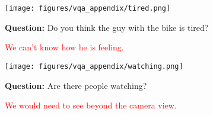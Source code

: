 \begin{figure}[h]
\begin{tcolorbox}[colback=gray!4, colframe=gray!50, arc=2mm, boxrule=0.5pt,left=9pt,right=9pt]
\begin{minipage}{0.48\textwidth}
\begin{tcolorbox}[colback=white, colframe=gray!50, arc=2mm, boxrule=0.5pt]
\begin{minipage}{0.46\textwidth}
\texttt{[image: figures/vqa\_appendix/tired.png]}
\end{minipage}
\hfill
\begin{minipage}{0.5\textwidth}
\textbf{Question:} Do you think the guy with the bike is tired?\\
\end{minipage}
\end{tcolorbox}
\hspace{1.4em}\textcolor{red}{We can't know how he is feeling.}
\end{minipage}
\hfill
\begin{minipage}{0.48\textwidth}
    \begin{tcolorbox}[colback=white, colframe=gray!50, arc=2mm, boxrule=0.5pt]
\begin{minipage}{0.46\textwidth}
\texttt{[image: figures/vqa\_appendix/watching.png]}
\end{minipage}
\hfill
\begin{minipage}{0.5\textwidth}
\textbf{Question:} Are there people watching?\\
\end{minipage}
    \end{tcolorbox}
    \hspace{1.4em}\textcolor{red}{We would need to see beyond the camera view.}
\end{minipage}
\vspace{1em}


\end{tcolorbox}
\end{figure}
